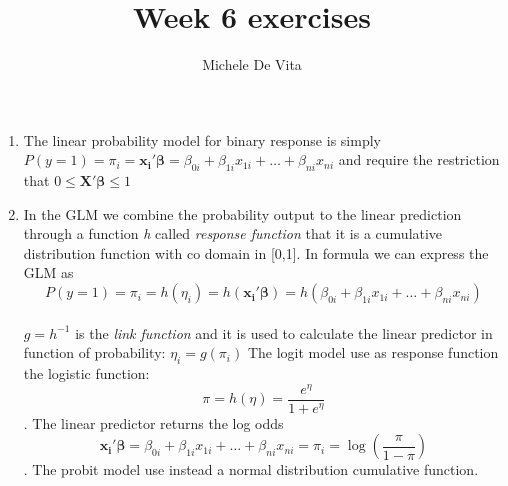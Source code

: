 \documentclass[10pt,a4paper]{article}
\author{Michele De Vita}
\title{Week 6 exercises}
\begin{document}
	\maketitle
	\begin{enumerate}
		\item The linear probability model for binary response is simply $ P(y = 1) =   \pi_i = \mathbf{x_i'\beta} = \beta_{0i} + 
		\beta_{1i} x_{1i}  + \dots + \beta_{ni} x_{ni}   $ and require the restriction that $ 0  \leq  \mathbf{X'\beta}  \leq 1 $ 
		\item In the GLM we combine the probability output to the linear prediction through a function \textit{h} called \textit{response function} that it is a cumulative distribution function with co domain in [0,1]. In formula we can express the GLM as $$ P(y = 1) =   \pi_i = h(\eta_i) = h(\mathbf{x_i'\beta}) = h(\beta_{0i} + 
		\beta_{1i} x_{1i}  + \dots + \beta_{ni} x_{ni})  $$\\$ g = h^{-1} $ is the \textit{link function} and it is used to calculate the linear predictor in function of probability: $ \eta_i = g(\pi_i) $ 
		The logit model use as response function the logistic function: $$ \pi = h(\eta) = \dfrac{e^\eta}{1 + e^\eta} $$. The linear predictor returns the log odds $$ \mathbf{x_i'\beta} = \beta_{0i} + 
		\beta_{1i} x_{1i}  + \dots + \beta_{ni} x_{ni} =  \pi_i = \log\left(\dfrac{\pi}{1 - \pi}\right)   $$.
		The probit model use instead a normal distribution cumulative function.
	\end{enumerate}
\end{document}

